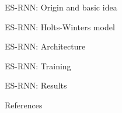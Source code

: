\documentclass[aspectratio=169, 12pt]{beamer}
\begin{document}
\begin{frame}{ES-RNN: Origin and basic idea}
    
\end{frame}

\begin{frame}{ES-RNN: Holts-Winters model}
    
\end{frame}

\begin{frame}[fragile]{ES-RNN: Architecture}
    \begin{figure}[htbp]
    \centering
    \def\svgwidth{\columnwidth}
    
    \end{figure}
\end{frame}

\begin{frame}[allowframebreaks]{ES-RNN: Training}
    
\end{frame}

\begin{frame}[allowframebreaks]{ES-RNN: Results}
    
\end{frame}

\begin{frame}[allowframebreaks]{References}

  
  

\end{frame}
\end{document}
